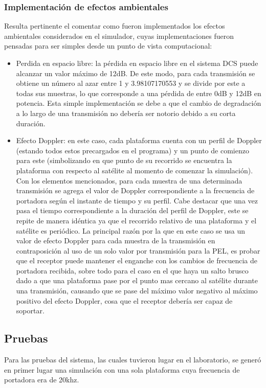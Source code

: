 \documentclass[a4paper,10pt]{article}
\begin{document}
\subsubsection{Implementación de efectos ambientales}
Resulta pertinente el comentar como fueron implementados los efectos ambientales considerados en el simulador, cuyas implementaciones fueron pensadas para ser simples desde un punto de vista computacional:
\begin{itemize}
\item Perdida en espacio libre: la pérdida en espacio libre en el sistema DCS puede alcanzar un valor máximo de 12dB. De este modo, para cada transmisión se obtiene un número al azar entre 1 y 3.98107170553 y se divide por este a todas sus muestras, lo que corresponde a una pérdida de entre 0dB y 12dB en potencia. Esta simple implementación se debe a que el cambio de degradación a lo largo de una transmisión no debería ser notorio debido a su corta duración.
\item Efecto Doppler: en este caso, cada plataforma cuenta con un perfil de Doppler (estando todos estos precargados en el programa) y un punto de comienzo para este (simbolizando en que punto de su recorrido se encuentra la plataforma con respecto al satélite al momento de comenzar la simulación). Con los elementos mencionados, para cada muestra de una determinada transmisión se agrega el valor de Doppler correspondiente a la frecuencia de portadora según el instante de tiempo y su perfil. Cabe destacar que una vez pasa el tiempo correspondiente a la duración del perfil de Doppler, este se repite de manera idéntica ya que el recorrido relativo de una plataforma y el satélite es periódico. La principal razón por la que en este caso se usa un valor de efecto Doppler para cada muestra de la transmisión en contraposición al uso de un solo valor por transmisión para la PEL, es probar que el receptor puede mantener el enganche con los cambios de frecuencia de portadora recibida,  sobre todo para el caso en el que haya un salto brusco dado a que una plataforma pase por el punto mas cercano al satélite durante una transmisión, causando que se pase del máximo valor negativo al máximo positivo del efecto Doppler, cosa que el receptor debería ser capaz de soportar.
\end{itemize}

\subsection{Pruebas}
Para las pruebas del sistema, las cuales tuvieron lugar en el laboratorio, se generó en primer lugar una simulación con una sola plataforma cuya frecuencia de portadora era de 20khz. 
\end{document}
